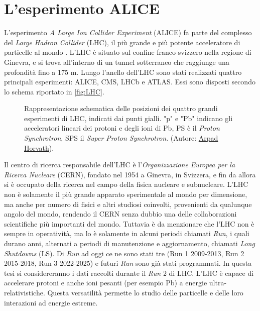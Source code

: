 \section{L'esperimento ALICE}
L'esperimento \emph{A Large Ion Collider Experiment} (ALICE) \cite{The_ALICE_Collaboration_2008} fa parte del complesso del \emph{Large Hadron Collider} (LHC), il più grande e più potente acceleratore di particelle al mondo \cite{Lyndon_Evans_2008}.
L'LHC è situato sul confine franco-svizzero nella regione di Ginevra, e si trova all'interno di un tunnel sotterraneo che raggiunge una profondità fino a 175 m.
Lungo l'anello dell'LHC sono stati realizzati quattro principali esperimenti: ALICE, CMS, LHCb e ATLAS.
Essi sono disposti secondo lo schema riportato in \autoref{fig:LHC}.
\begin{figure}[htb]
    \centering
    
    \caption{Rappresentazione schematica delle posizioni dei quattro grandi esperimenti di LHC, indicati dai punti gialli. "p" e "Pb" indicano gli acceleratori lineari dei protoni e degli ioni di Pb, PS è il \emph{Proton Synchrotron}, SPS il \emph{Super Proton Synchrotron}. (Autore: \href{https://it.m.wikipedia.org/wiki/File:LHC.svg}{Arpad Horvath}).}
    \label{fig:LHC}
\end{figure}
Il centro di ricerca responsabile dell'LHC è l'\emph{Organizzazione Europea per la Ricerca Nucleare} (CERN), fondato nel 1954 a Ginevra, in Svizzera, e fin da allora si è occupato della ricerca nel campo della fisica nucleare e subnucleare.
L'LHC non è solamente il più grande apparato sperimentale al mondo per dimensione, ma anche per numero di fisici e altri studiosi coinvolti, provenienti da qualunque angolo del mondo, rendendo il CERN senza dubbio una delle collaborazioni scientifiche più importanti del mondo.   
Tuttavia è da menzionare che l'LHC non è sempre in operatività, ma lo è solamente in alcuni periodi chiamati \emph{Run}, i quali durano anni, alternati a periodi di manutenzione e aggiornamento, chiamati \emph{Long Shutdowns} (LS).
Di \textit{Run} ad oggi ce ne sono stati tre (Run 1 2009-2013, Run 2 2015-2018, Run 3 2022-2025) e futuri \textit{Run} sono già stati programmati.
In questa tesi si considereranno i dati raccolti durante il \textit{Run} 2 di LHC.
L'LHC è capace di accelerare protoni e anche ioni pesanti (per esempio Pb) a energie ultra-relativistiche.
Questa versatilità permette lo studio delle particelle e delle loro interazioni ad energie estreme.

